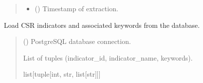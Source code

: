 \documentclass[letterpaper,10pt,english]{sphinxmanual}
\begin{document}
\begin{fulllineitems}
\begin{quote}
\begin{description}
\begin{itemize}
\item {} 
\sphinxAtStartPar
{} () \textendash{} Timestamp of extraction.

\end{itemize}

\end{description}\end{quote}

\end{fulllineitems}


\begin{fulllineitems}
\label{\detokenize{modules.data_storage:modules.data_storage.paragraph_extraction.load_indicators_from_db}}
\pysigstartsignatures
\pysiglinewithargsret
{}
{}
{}
\pysigstopsignatures
\sphinxAtStartPar
Load CSR indicators and associated keywords from the database.
\begin{quote}\begin{description}
\sphinxAtStartPar
{} () \textendash{} PostgreSQL database connection.

\sphinxAtStartPar
List of tuples (indicator\_id, indicator\_name, keywords).

\sphinxAtStartPar
list{[}tuple{[}int, str, list{[}str{]}{]}{]}

\end{description}\end{quote}

\end{fulllineitems}

\end{document}
